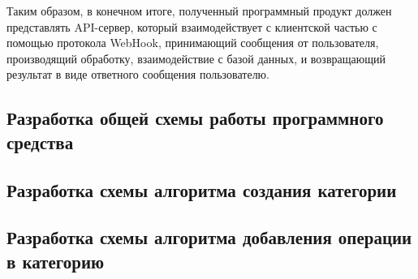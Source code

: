 Таким образом, в конечном итоге, полученный программный продукт должен представлять API-сервер, который взаимодействует с клиентской частью с помощью протокола WebHook, принимающий сообщения от пользователя, производящий обработку, взаимодействие с базой данных, и возвращающий результат в виде ответного сообщения пользователю.

\subsection{Разработка общей схемы работы программного средства}
\label{sec:design:mainscheme}
\subsection{Разработка схемы алгоритма создания категории}
\label{sec:design:categorycreation}
\subsection{Разработка схемы алгоритма добавления операции в категорию}
\label{sec:design:server}